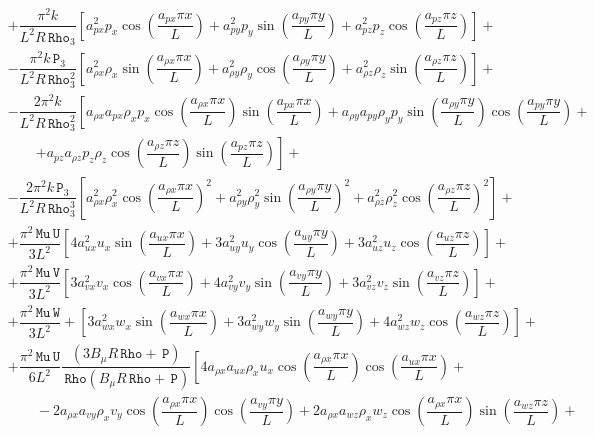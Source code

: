 \documentclass[10pt]{article}
\newcommand{\Rho}{\,\mathtt{Rho}}
\newcommand{\PP}{\,\mathtt{P}}
\newcommand{\U}{\,\mathtt{U}}
\newcommand{\V}{\,\mathtt{V}}
\newcommand{\W}{\,\mathtt{W}}
\newcommand{\MU}{\,\mathtt{Mu}}
\begin{document}
\begin{equation}
\begin{split}
&+\dfrac{ \pi^2 k}{L^2 R \Rho_3}\left[a_{px}^2 p_x \cos\left(\dfrac{a_{px} \pi x}{L}\right)+a_{py}^2 p_y \sin\left(\dfrac{a_{py} \pi y}{L}\right)+a_{pz}^2 p_z \cos\left(\dfrac{a_{pz} \pi z}{L}\right)\right] +\\
&-\dfrac{ \pi^2 k \PP_3}{L^2 R \Rho_3^2}\left[a_{\rho x}^2 \rho_x \sin\left(\dfrac{a_{\rho x} \pi x}{L}\right)+a_{\rho y}^2 \rho_y \cos\left(\dfrac{a_{\rho y} \pi y}{L}\right)+a_{\rho z}^2 \rho_z \sin\left(\dfrac{a_{\rho z} \pi z}{L}\right)\right] +\\
&- \dfrac{2 \pi^2 k}{L^2 R \Rho_3^2}\left[a_{\rho x} a_{px} \rho_x p_x \cos\left(\dfrac{a_{\rho x} \pi x}{L}\right) \sin\left(\dfrac{a_{px} \pi x}{L}\right)+a_{\rho y} a_{py} \rho_y p_y \sin\left(\dfrac{a_{\rho y} \pi y}{L}\right) \cos\left(\dfrac{a_{py} \pi y}{L}\right)\right.+\\
    &\qquad\left.+a_{pz} a_{\rho z} p_z \rho_z \cos\left(\dfrac{a_{\rho z} \pi z}{L}\right) \sin\left(\dfrac{a_{pz} \pi z}{L}\right)\right] +\\
&-  \dfrac{2\pi^2 k \PP_3}{L^2 R \Rho_3^3}\left[a_{\rho x}^2 \rho_x^2 \cos\left(\dfrac{a_{\rho x} \pi x}{L}\right)^2+a_{\rho y}^2 \rho_y^2 \sin\left(\dfrac{a_{\rho y} \pi y}{L}\right)^2+a_{\rho z}^2 \rho_z^2 \cos\left(\dfrac{a_{\rho z} \pi z}{L}\right)^2\right] +\\
&+\dfrac{  \pi^2 \MU \U }{3L^2}\left[4 a_{ux}^2 u_x \sin\left(\dfrac{a_{ux} \pi x}{L}\right)+3 a_{uy}^2 u_y \cos\left(\dfrac{a_{uy} \pi y}{L}\right)+3 a_{uz}^2 u_z \cos\left(\dfrac{a_{uz} \pi z}{L}\right)\right] +\\
%
&+ \dfrac{  \pi^2 \MU \V }{3L^2}\left[3 a_{vx}^2 v_x \cos\left(\dfrac{a_{vx} \pi x}{L}\right)+4 a_{vy}^2 v_y \sin\left(\dfrac{a_{vy} \pi y}{L}\right)+3 a_{vz}^2 v_z \sin\left(\dfrac{a_{vz} \pi z}{L}\right)\right] +\\
%
&+ \dfrac{  \pi^2 \MU \W  }{3L^2} +\left[3 a_{wx}^2 w_x \sin\left(\dfrac{a_{wx} \pi x}{L}\right)+3 a_{wy}^2 w_y \sin\left(\dfrac{a_{wy} \pi y}{L}\right)+4 a_{wz}^2 w_z \cos\left(\dfrac{a_{wz} \pi z}{L}\right)\right]+\\
%
&+ \dfrac{ \pi^2 \MU \U }{6L^2} \dfrac{(3 B_\mu R \Rho+\PP)}{\Rho (B_\mu R \Rho+\PP) } \left[4 a_{\rho x} a_{ux} \rho_x u_x \cos\left(\dfrac{a_{\rho x} \pi x}{L}\right) \cos\left(\dfrac{a_{ux} \pi x}{L}\right)+\right.\\
    &\qquad -2 a_{\rho x} a_{vy} \rho_x v_y \cos\left(\dfrac{a_{\rho x} \pi x}{L}\right) \cos\left(\dfrac{a_{vy} \pi y}{L}\right)+2 a_{\rho x} a_{wz} \rho_x w_z \cos\left(\dfrac{a_{\rho x} \pi x}{L}\right) \sin\left(\dfrac{a_{wz} \pi z}{L}\right)+\\

\end{split}
\end{equation}
\end{document}
